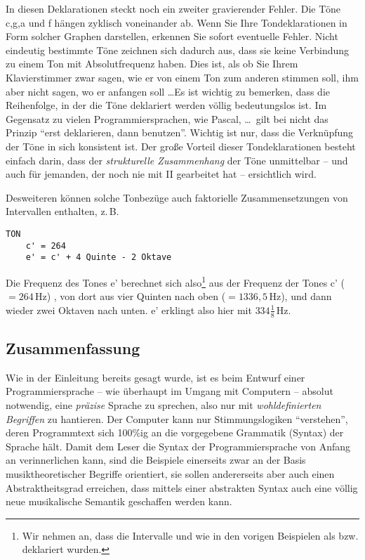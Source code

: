 In diesen Deklarationen steckt noch
ein zweiter gravierender Fehler. Die Töne c,g,a und f hängen zyklisch
voneinander ab. Wenn Sie Ihre Tondeklarationen in Form solcher Graphen
darstellen, erkennen Sie sofort eventuelle Fehler. Nicht eindeutig
bestimmte Töne zeichnen sich dadurch aus, dass sie keine Verbindung zu
einem Ton mit Absolutfrequenz haben. Dies ist, als ob Sie Ihrem
Klavierstimmer zwar sagen, wie er von einem Ton zum anderen stimmen
soll, ihm aber nicht sagen, wo er anfangen soll \ldots Es ist wichtig
zu bemerken, dass die Reihenfolge, in der die Töne deklariert werden
völlig bedeutungslos ist. Im Gegensatz zu vielen Programmiersprachen,
wie Pascal, \ldots \ gilt bei \mutabor{} nicht das Prinzip "`erst
deklarieren, dann benutzen"'. Wichtig ist nur, dass die Verknüpfung der
Töne in sich konsistent ist. Der große Vorteil dieser Tondeklarationen
besteht einfach darin, dass der \emph{strukturelle Zusammenhang} der
Töne unmittelbar -- und auch für jemanden, der noch nie mit \mutabor{} II
gearbeitet hat -- ersichtlich wird.

Desweiteren können solche Tonbezüge auch faktorielle
Zusammensetzungen von Intervallen enthalten, z.\,B.
\begin{verbatim}
TON
    c' = 264
    e' = c' + 4 Quinte - 2 Oktave
\end{verbatim}
Die Frequenz des Tones e' berechnet sich also\footnote{Wir nehmen an,
  dass die Intervalle  und  wie in den vorigen
  Beispielen als  bzw.  deklariert wurden.} aus der
Frequenz der Tones c' (${}=264\,\mathrm{Hz}$) , von dort aus vier Quinten nach oben
(${}=1336{,}5\,\mathrm{Hz}$), und dann wieder zwei Oktaven nach unten. e' erklingt
also hier mit $334\frac{1}{8}\,\mathrm{Hz}$.

\subsection{Zusammenfassung}\label{sec:zusammenfassung}
Wie in der Einleitung bereits gesagt wurde, ist es beim Entwurf einer
Programmiersprache -- wie überhaupt im Umgang mit Computern -- absolut
notwendig, eine \emph{präzise} Sprache zu sprechen, also nur mit {\em
  wohldefinierten Begriffen} zu hantieren. Der Computer kann nur
Stimmungslogiken "`verstehen"', deren Programmtext sich 100\%ig an
die vorgegebene Grammatik (Syntax) der Sprache hält. Damit dem Leser
die Syntax der Programmiersprache von Anfang an verinnerlichen kann,
sind die Beispiele einerseits zwar an der Basis musiktheoretischer
Begriffe orientiert, sie sollen andererseits aber auch einen
Abstraktheitsgrad erreichen, dass mittels einer abstrakten Syntax auch
eine völlig neue musikalische Semantik geschaffen werden kann.


